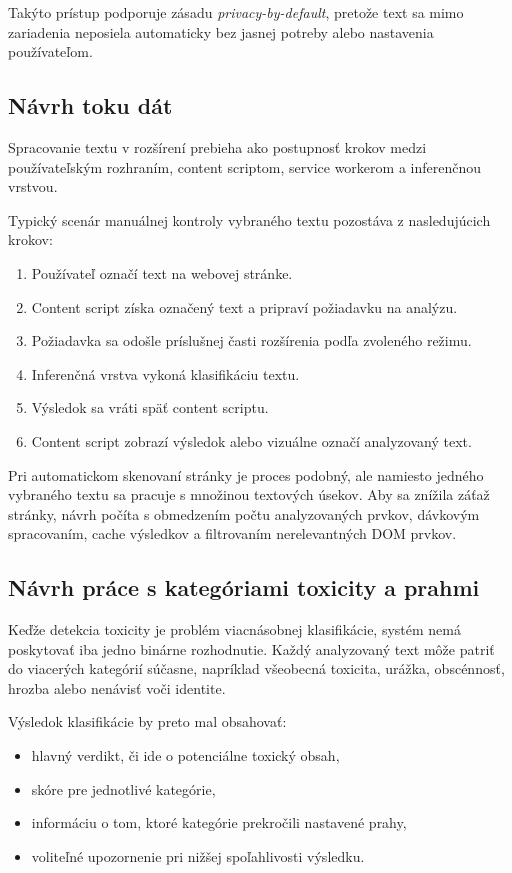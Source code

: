 Takýto prístup podporuje zásadu \textit{privacy-by-default}, pretože text sa mimo zariadenia neposiela automaticky bez jasnej potreby alebo nastavenia používateľom.

\subsection{Návrh toku dát}
Spracovanie textu v rozšírení prebieha ako postupnosť krokov medzi používateľským rozhraním, content scriptom, service workerom a inferenčnou vrstvou.

Typický scenár manuálnej kontroly vybraného textu pozostáva z nasledujúcich krokov:
\begin{enumerate}
  \item Používateľ označí text na webovej stránke.
  \item Content script získa označený text a pripraví požiadavku na analýzu.
  \item Požiadavka sa odošle príslušnej časti rozšírenia podľa zvoleného režimu.
  \item Inferenčná vrstva vykoná klasifikáciu textu.
  \item Výsledok sa vráti späť content scriptu.
  \item Content script zobrazí výsledok alebo vizuálne označí analyzovaný text.
\end{enumerate}

Pri automatickom skenovaní stránky je proces podobný, ale namiesto jedného vybraného textu sa pracuje s množinou textových úsekov. Aby sa znížila záťaž stránky, návrh počíta s obmedzením počtu analyzovaných prvkov, dávkovým spracovaním, cache výsledkov a filtrovaním nerelevantných DOM prvkov.

\subsection{Návrh práce s kategóriami toxicity a prahmi}
Keďže detekcia toxicity je problém viacnásobnej klasifikácie, systém nemá poskytovať iba jedno binárne rozhodnutie. Každý analyzovaný text môže patriť do viacerých kategórií súčasne, napríklad všeobecná toxicita, urážka, obscénnosť, hrozba alebo nenávisť voči identite.

Výsledok klasifikácie by preto mal obsahovať:
\begin{itemize}
  \item hlavný verdikt, či ide o potenciálne toxický obsah,
  \item skóre pre jednotlivé kategórie,
  \item informáciu o tom, ktoré kategórie prekročili nastavené prahy,
  \item voliteľné upozornenie pri nižšej spoľahlivosti výsledku.
\end{itemize}

